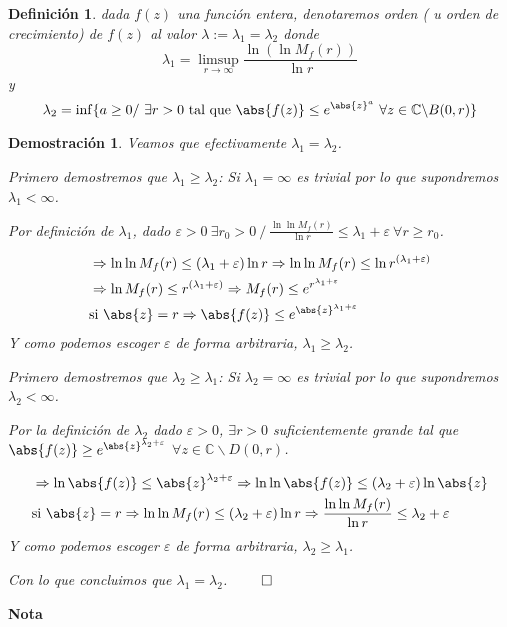 \documentclass[12pt]{book}
\newtheorem{defi}{Definición}[chapter]
\newtheorem*{dem}{Demostración}
\newcommand{\C}{\mathbb{C}}
\begin{document}
\begin{defi}
dada $f(z)$ una función entera, denotaremos orden ( u orden de crecimiento) de $f(z)$ al valor $\lambda:=\lambda_1 = \lambda_2$ donde
$$
\lambda_1 = \limsup_{r\to \infty}\frac{\ln(\ln M_f(r))}{\ln r}
$$
y
$$
\lambda_2 = \inf\{a\geq 0 /\ \exists r >0 \text{ tal que } \abs{f(z)}\leq e^{\abs{z}^a}\ \forall z\in\C \backslash B(0,r)\}
$$
\end{defi}

\begin{dem} Veamos que efectivamente $\lambda_1 = \lambda_2$.

Primero demostremos que $\lambda_1 \geq \lambda_2$:
Si $\lambda_1 = \infty$ es trivial por lo que supondremos $\lambda_1<\infty$.

Por definición de $\lambda_1$, dado $\varepsilon >0\ \exists r_0>0\ /\  \frac{\ln\ln M_f(r)}{\ln r} \leq \lambda_1 + \varepsilon\ \forall r\geq r_0$.

\begin{align*}
& \Rightarrow \ln\ln M_f(r) \leq (\lambda_1+\varepsilon)\ln r \Rightarrow \ln\ln M_f(r) \leq \ln r^{(\lambda_1+\varepsilon)} \\
& \Rightarrow  \ln M_f(r) \leq r^{(\lambda_1+\varepsilon)}\Rightarrow M_f(r) \leq e^{r^{\lambda_1+\varepsilon}}\\
& \text{si } \abs{z} = r \Rightarrow \abs{f(z)} \leq e^{\abs{z}^{\lambda_1 + \varepsilon}}
\end{align*}
Y como podemos escoger $\varepsilon$ de forma arbitraria, $\lambda_1 \geq \lambda_2$.

Primero demostremos que $\lambda_2 \geq \lambda_1$:
Si $\lambda_2 = \infty$ es trivial por lo que supondremos $\lambda_2<\infty$.

Por la definición de $\lambda_2$ dado $\varepsilon>0$, $\exists r>0$ suficientemente grande tal que $\abs{f(z)}\geq e^{\abs{z}^{\lambda_2+\varepsilon}}$ $\forall z\in \C\backslash D(0,r)$.

\begin{align*}
&\Rightarrow \ln\abs{f(z)} \leq \abs{z}^{\lambda_2+\varepsilon} \Rightarrow \ln\ln \abs{f(z)} \leq (\lambda_2+\varepsilon)\ln\abs{z}\\
&\text{si }\abs{z}=r \Rightarrow \ln\ln M_f(r) \leq (\lambda_2+\varepsilon)\ln r \Rightarrow \frac{\ln\ln M_f(r)}{\ln r} \leq \lambda_2 + \varepsilon
\end{align*}
Y como podemos escoger $\varepsilon$ de forma arbitraria, $\lambda_2 \geq \lambda_1$.

Con lo que concluimos que $\lambda_1 =\lambda_2$. $\qed$

\end{dem}
\textbf{Nota}
\end{document}
